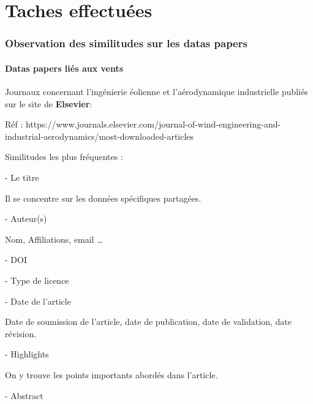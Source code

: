 \documentclass[11pt,oneside]{article}
\begin{document}
\part*{Taches effectuées}
\section*{Observation des similitudes sur les datas papers}
\subsection*{Datas papers liés aux vents}
\begin{flushleft}
Journaux concernant l’ingénierie éolienne et l’aérodynamique industrielle publiés sur le site de \textbf{Elsevier}:
\end{flushleft}

\begin{flushleft}
Réf : https://www.journals.elsevier.com/journal-of-wind-engineering-and-industrial-aerodynamics/most-downloaded-articles
\end{flushleft}

\begin{flushleft}
Similitudes les plus fréquentes :
\end{flushleft}

-	Le titre

\begin{flushleft}
Il se concentre sur les données spécifiques partagées.
\end{flushleft}

-	Auteur(s)

\begin{flushleft}
Nom, Affiliations, email …
\end{flushleft}

-	DOI

-	Type de licence

-	Date de l’article

\begin{flushleft}
Date de soumission de l’article, date de publication, date de validation, date révision.
\end{flushleft}

\newpage

-	Highlights

\begin{flushleft}
On y trouve les points importants abordés dans l’article.
\end{flushleft}

-	Abstract
\end{document}
